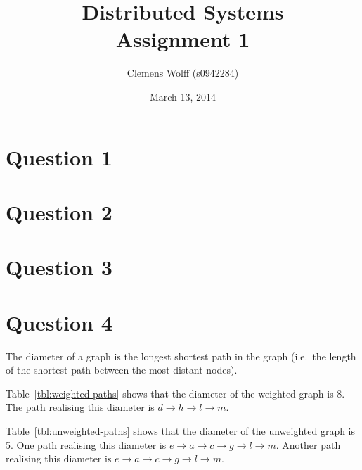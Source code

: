 \documentclass[a4paper,onecolumn,oneside]{article}
\title{Distributed Systems\\Assignment 1}
\author{Clemens Wolff (s0942284)}
\date{March 13, 2014}
\begin{document}
\maketitle

\section*{Question 1}
\section*{Question 2}
\section*{Question 3}
\section*{Question 4}

The diameter of a graph is the longest shortest path in the graph (i.e.\ the
length of the shortest path between the most distant nodes).

Table~\ref{tbl:weighted-paths} shows that the diameter of the weighted graph is
8.  The path realising this diameter is $d\rightarrow h\rightarrow l\rightarrow
m$.

Table~\ref{tbl:unweighted-paths} shows that the diameter of the unweighted graph
is 5.  One path realising this diameter is $e\rightarrow a\rightarrow
c\rightarrow g\rightarrow l\rightarrow m$.  Another path realising this diameter
is $e\rightarrow a\rightarrow c\rightarrow g\rightarrow l\rightarrow m$.
\end{document}
